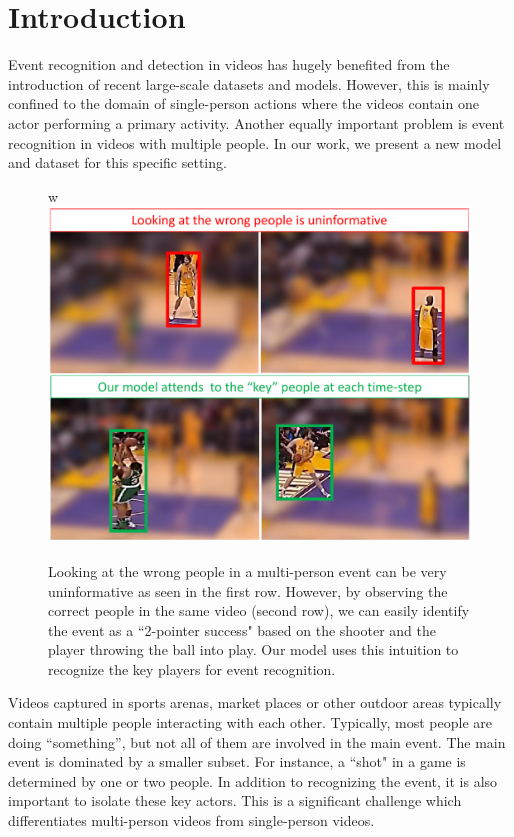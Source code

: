 \section{Introduction}

Event recognition and detection in videos has hugely benefited from the
introduction of recent large-scale datasets
\cite{THUMOS,UCF101,Karpathy_CVPR14,MED11} and models.  However, this is mainly
confined to the domain of single-person actions where the videos contain one
actor performing a primary activity.  Another equally important problem is
event recognition in videos with multiple people. In our work, we present a new
model and dataset for this specific setting.

\begin{figure}[ht!]
\begin{center}w
  \includegraphics[width=3.2 in]{images/pull_figure_v3_cropped.pdf}
\end{center}
\caption{Looking at the wrong people in a multi-person event can be very uninformative
  as seen in the first row. However, by observing the correct people in the same video
  (second row), we can easily identify the event as a ``2-pointer success" based
  on the shooter and
the player throwing the ball into play. Our model uses this intuition
to recognize the key players for event recognition.}
\label{fig:pull_figure}
\end{figure}

Videos captured in sports arenas, market places or other outdoor areas
typically contain multiple people interacting with each other.
Typically, most people are doing ``something'', but not all of them are involved in the main event.
The main event is dominated by a smaller subset. For instance, a ``shot" in a game
 is determined by one or two people.
In addition to recognizing the event, it is also important
to isolate these key actors. This is a significant challenge which
differentiates multi-person videos from single-person videos.

